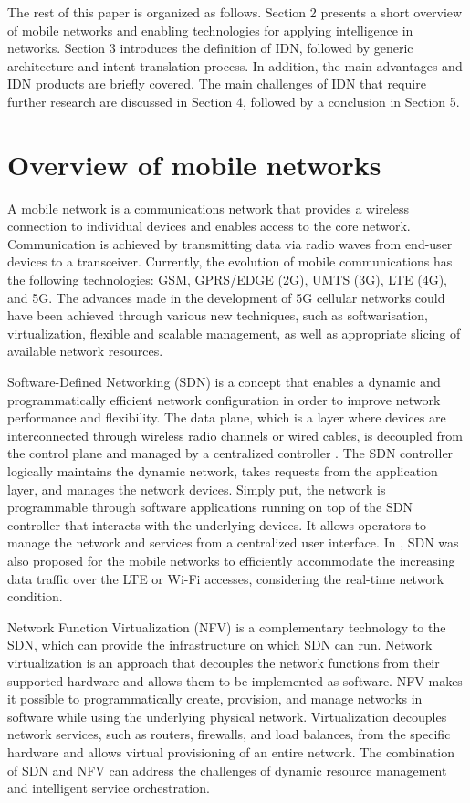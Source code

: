 The rest of this paper is organized as follows. Section 2 presents a short overview of mobile networks and enabling technologies for applying intelligence in networks. Section 3 introduces the definition of IDN, followed by generic architecture and intent translation process. In addition, the main advantages and IDN products are briefly covered. The main challenges of IDN that require further research are discussed in Section 4, followed by a conclusion in Section 5.

\section{Overview of mobile networks}
\label{sec:Overview_of_mobile_networks}

A mobile network is a communications network that provides a wireless connection to individual devices and enables access to the core network. Communication is achieved by transmitting data via radio waves from end-user devices to a transceiver. Currently, the evolution of mobile communications has the following technologies: GSM, GPRS/EDGE (2G), UMTS (3G), LTE (4G), and 5G. The advances made in the development of 5G cellular networks could have been achieved through various new techniques, such as softwarisation, virtualization, flexible and scalable management, as well as appropriate slicing of available network resources.\cite{Demestichas2013}

Software-Defined Networking (SDN) is a concept that enables a dynamic and programmatically efficient network configuration in order to improve network performance and flexibility. The data plane, which is a layer where devices are interconnected through wireless radio channels or wired cables, is decoupled from the control plane and managed by a centralized controller \cite{Li2015}. The SDN controller logically maintains the dynamic network, takes requests from the application layer, and manages the network devices. Simply put, the network is programmable through software applications running on top of the SDN controller that interacts with the underlying devices. It allows operators to manage the network and services from a centralized user interface. In \cite{Amani2014}, SDN was also proposed for the mobile networks to efficiently accommodate the increasing data traffic over the LTE or Wi-Fi accesses, considering the real-time network condition.

Network Function Virtualization (NFV) is a complementary technology to the SDN, which can provide the infrastructure on which SDN can run. Network virtualization is an approach that decouples the network functions from their supported hardware and allows them to be implemented as software. NFV makes it possible to programmatically create, provision, and manage networks in software while using the underlying physical network. Virtualization decouples network services, such as routers, firewalls, and load balances, from the specific hardware and allows virtual provisioning of an entire network. The combination of SDN and NFV can address the challenges of dynamic resource management and intelligent service orchestration. \cite{Li2015}

